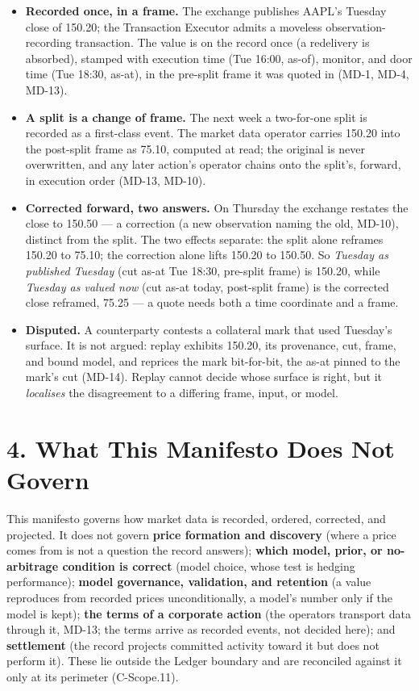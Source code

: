 \documentclass[11pt,a4paper]{article}
\providecommand{\tightlist}{\setlength{\itemsep}{2pt}\setlength{\parskip}{0pt}}
\begin{document}
\begin{itemize}
\tightlist
\item \textbf{Recorded once, in a frame.} The exchange publishes AAPL's
  Tuesday close of 150.20; the Transaction Executor admits a moveless
  observation-recording transaction. The value is on the record once
  (a redelivery is absorbed), stamped with execution time (Tue 16:00,
  as-of), monitor, and door time (Tue 18:30, as-at), in the pre-split
  frame it was quoted in (MD-1, MD-4, MD-13).
\item \textbf{A split is a change of frame.} The next week a two-for-one
  split is recorded as a first-class event. The market data operator
  carries 150.20 into the post-split frame as 75.10, computed at read; the
  original is never overwritten, and any later action's operator chains
  onto the split's, forward, in execution order (MD-13, MD-10).
\item \textbf{Corrected forward, two answers.} On Thursday the exchange
  restates the close to 150.50 --- a correction (a new observation naming
  the old, MD-10), distinct from the split. The two effects separate: the
  split alone reframes 150.20 to 75.10; the correction alone lifts 150.20
  to 150.50. So \emph{Tuesday as published Tuesday} (cut as-at Tue 18:30,
  pre-split frame) is 150.20, while \emph{Tuesday as valued now} (cut
  as-at today, post-split frame) is the corrected close reframed, 75.25 ---
  a quote needs both a time coordinate and a frame.
\item \textbf{Disputed.} A counterparty contests a collateral mark that
  used Tuesday's surface. It is not argued: replay exhibits 150.20, its
  provenance, cut, frame, and bound model, and reprices the mark
  bit-for-bit, the as-at pinned to the mark's cut (MD-14). Replay cannot
  decide whose surface is right, but it \emph{localises} the disagreement
  to a differing frame, input, or model.
\end{itemize}

\section{4. What This Manifesto Does Not Govern}

This manifesto governs how market data is recorded, ordered, corrected,
and projected. It does not govern \textbf{price formation and discovery}
(where a price comes from is not a question the record answers);
\textbf{which model, prior, or no-arbitrage condition is correct} (model
choice, whose test is hedging performance); \textbf{model governance,
validation, and retention} (a value reproduces from recorded prices
unconditionally, a model's number only if the model is kept); \textbf{the
terms of a corporate action} (the operators transport data through it,
MD-13; the terms arrive as recorded events, not decided here); and
\textbf{settlement} (the record projects committed activity toward it but
does not perform it). These lie outside the Ledger boundary and are
reconciled against it only at its perimeter (C-Scope.11).
\end{document}
